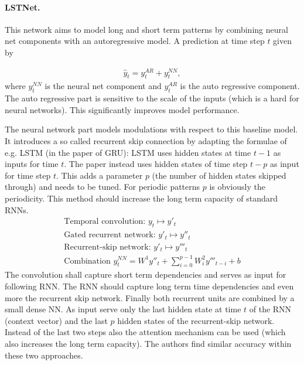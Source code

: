 \documentclass[12pt,a4paper]{article}
\begin{document}
\paragraph{LSTNet.} This network \cite{lstnet_2017} aims to model long and short term patterns by combining neural net components with an autoregressive model. A prediction at time step $t$ given by

\begin{align}
	\hat y_t = y_t^{AR} + y_t^{NN},
\end{align}
where $y_t^{NN}$ is the  neural net component and $y_t^{AR}$ is the auto regressive component. The auto regressive part is sensitive to the scale of the inputs (which is a hard for neural networks). This significantly improves model performance. 

The neural network part models modulations with respect to this baseline model. It introduces a so called recurrent skip connection by adapting the formulae of e.g. LSTM (in the paper of GRU): LSTM  uses hidden states at time $t-1$ as inputs for time $t$. The paper instead uses hidden states of time step $t-p$ as input for time step $t$. This adds a parameter $p$ (the number of hidden states skipped through) and needs to be tuned. For periodic patterns $p$ is obviously the periodicity. This method should increase the long term capacity of standard RNNs.
\begin{align}
 	\text{Temporal convolution: } y_t \mapsto y'_t \\
 	\text{Gated recurrent network: } y'_t \mapsto y''_t \\ 
	\text{Recurrent-skip network: } y'_t \mapsto y'''_t \\ 	
	\text{Combination } y_t^{NN} = W^1y''_t +  \sum_{i=0}^{p-1}W^2_iy'''_{t-i} + b   
\end{align}
The convolution shall capture short term dependencies and serves as input for following RNN. The RNN should capture long term time dependencies and even more the recurrent skip network.  Finally both recurrent units are combined by a small dense NN. As input serve only the last hidden state at time $t$ of the RNN (context vector) and the last $p$ hidden states of the recurrent-skip network. Instead of the last two steps also the attention mechanism can be used (which also increases the long term capacity). The authors find similar accuracy within these two approaches.
\end{document}
